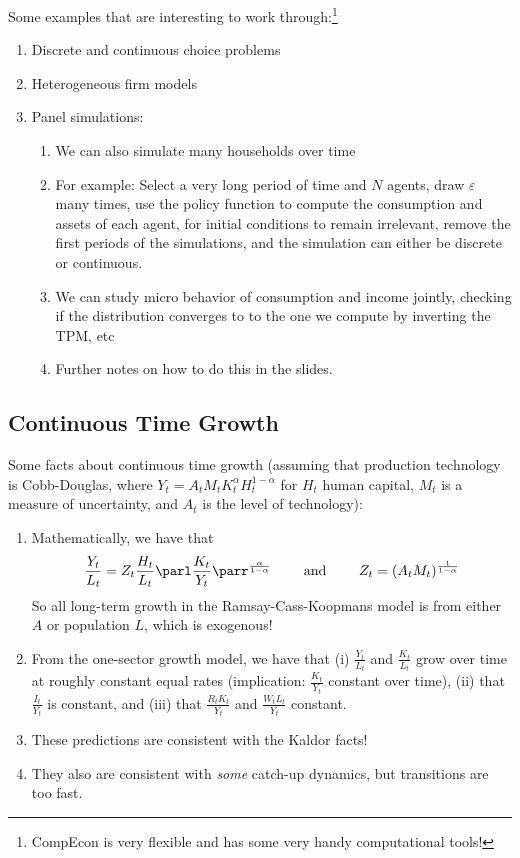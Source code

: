 \documentclass[10pt]{article}
\begin{document}
\begin{remark}
	Some examples that are interesting to work through:\footnote{CompEcon is very flexible and has some very handy computational tools!}
	\begin{enumerate}
		\item Discrete and continuous choice problems
		\item Heterogeneous firm models
		\item Panel simulations: \begin{enumerate} \item We can also simulate many households over time \item For example: Select a very long period of time and $N$ agents, draw $\varepsilon$ many times, use the policy function to compute the consumption and assets of each agent, for initial conditions to remain irrelevant, remove the first periods of the simulations, and the simulation can either be discrete or continuous. \item We can study micro behavior of consumption and income jointly, checking if the distribution converges to to the one we compute by inverting the TPM, etc  \item Further notes on how to do this in the slides.\end{enumerate}
	\end{enumerate}
\end{remark}

\subsection{Continuous Time Growth}

Some facts about continuous time growth (assuming that production technology is Cobb-Douglas, where $Y_t = A_tM_tK_t^\alpha H_t^{1-\alpha}$ for $H_t$ human capital, $M_t$ is a measure of uncertainty, and $A_t$ is the level of technology):
\begin{enumerate}
	\item Mathematically, we have that \[\frac{Y_t}{L_t} = Z_t \frac{H_t}{L_t}\parl \frac{K_t}{Y_t}\parr^{\frac{\alpha}{1-\alpha}} \qquad \text{ and } \qquad Z_t = (A_tM_t)^{\frac{1}{1-\alpha}}\] So all long-term growth in the Ramsay-Cass-Koopmans model is from either $A$ or population $L$, which is exogenous!
	\item From the one-sector growth model, we have that (i) $\frac{Y_t}{L_t}$ and $\frac{K_t}{L_t}$ grow over time at roughly constant equal rates (implication: $\frac{K_t}{Y_t}$ constant over time), (ii) that $\frac{I_t}{Y_t}$ is constant, and (iii) that $\frac{R_tK_t}{Y_t}$ and $\frac{W_tL_t}{Y_t}$ constant.
	\item These predictions are consistent with the Kaldor facts!
	\item They also are consistent with \emph{some} catch-up dynamics, but transitions are too fast.
\end{enumerate}
\end{document}
